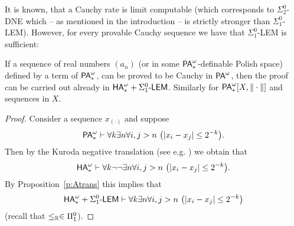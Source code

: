 It is known, that a Cauchy rate is limit computable (which corresponds 
to $\Sigma^0_2$-DNE which -- as mentioned in the introduction -- is 
strictly stronger than $\Sigma^0_1$-LEM). However, for every provable   
Cauchy sequence we have that $\Sigma^0_1$-LEM is sufficient:
\begin{prop}\label{p:limComp}
If a sequence of real numbers $(a_n)$ (or in some ${\textsf{\upshape PA}}^\omega_*$-definable Polish 
space) defined by a term of 
${\textsf{\upshape PA}}^\omega_*$, can be proved to be Cauchy in ${\textsf{\upshape PA}}^\omega$, then the proof can be carried 
out already in ${\textsf{\upshape HA}}^\omega_*+\Sigma^0_1\textsf{\upshape -LEM}$. Similarly for ${\textsf{\upshape PA}}^\omega_*[X,\|\cdot\|]$ and 
sequences in 
$X.$
\end{prop}
\begin{proof}
Consider a sequence $x_{(\cdot)}$ and suppose
\[ \pa_*\vdash \forall k\exists n\forall i,j>n\ 
\big(| x_i - x_j| \leq 2^{-k}\big). \]
Then by the Kuroda negative translation (see e.g. \cite{Kohlenbach08}) 
we obtain that
\[ {\textsf{\upshape HA}}^\omega_*\vdash \forall k\neg\neg\exists n\forall i,j>n\ \big(| 
x_i - x_j| \leq 2^{-k}\big). \]
By Proposition~\ref{p:Atrans} this implies that
\[ {\textsf{\upshape HA}}^\omega_*+\Sigma^0_1\textsf{\upshape -LEM}\vdash \forall k\exists n\forall i,j>n\ \big(| x_i - x_j| 
\leq 2^{-k}\big) \] (recall that $\le_{\mathbb{R}}\in\Pi^0_1$).
\end{proof}

